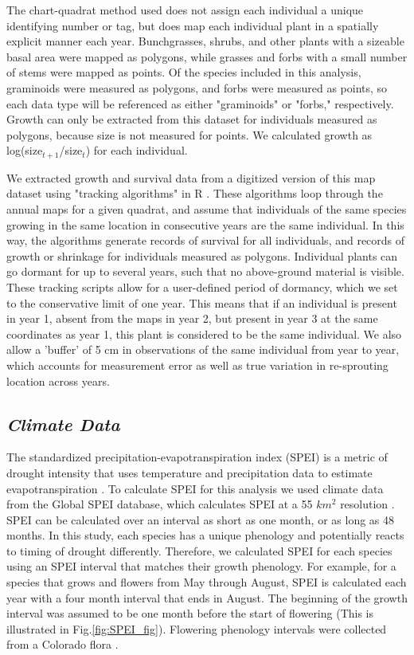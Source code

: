 \documentclass[12pt, letterpaper]{article}
\begin{document}
The chart-quadrat method used does not assign each individual a unique identifying number or tag, but does map each individual plant in a spatially explicit manner each year. Bunchgrasses, shrubs, and other plants with a sizeable basal area were mapped as polygons, while grasses and forbs with a small number of stems were mapped as points. Of the species included in this analysis, graminoids were measured as polygons, and forbs were measured as points, so each data type will be referenced as either "graminoids" or "forbs," respectively.  Growth can only be extracted from this dataset for individuals measured as polygons, because size is not measured for points. We calculated growth as log(size$_{t+1}$/size$_t$) for each individual.  

We extracted growth and survival data from a digitized version of this map dataset using "tracking algorithms" in R \citep{Lauenroth2008, RCoreTeam2019}. These algorithms loop through the annual maps for a given quadrat, and assume that individuals of the same species growing in the same location in consecutive years are the same individual. In this way, the algorithms generate records of survival for all individuals, and records of growth or shrinkage for individuals measured as polygons. Individual plants can go dormant for up to several years, such that no above-ground material is visible. These tracking scripts allow for a user-defined period of dormancy, which we set to the conservative limit of one year. This means that if an individual is present in year 1, absent from the maps in year 2, but present in year 3 at the same coordinates as year 1, this plant is considered to be the same individual. We also allow a 'buffer' of 5 cm in observations of the same individual from year to year, which accounts for measurement error as well as true variation in re-sprouting location across years. 
\subsection{\textit{Climate Data}} The standardized precipitation-evapotranspiration index (SPEI) is a metric of drought intensity that uses temperature and precipitation data to estimate evapotranspiration \citep{Vicente-Serrano2010}.  To calculate SPEI for this analysis we used climate data from the Global SPEI database, which calculates SPEI at a 55 $km^2$ resolution \citep{Vicente-Serrano2010}. SPEI can be calculated over an interval as short as one month, or as long as 48 months. In this study, each species has a unique phenology and potentially reacts to timing of drought differently. Therefore, we calculated SPEI for each species using an SPEI interval that matches their growth phenology. For example, for a species that grows and flowers from May through August, SPEI is calculated each year with a four month interval that ends in August. The beginning of the growth interval was assumed to be one month before the start of flowering (This is illustrated in Fig.\ref{fig:SPEI_fig}). Flowering phenology intervals were collected from a Colorado flora \citep{Ackerfield2015}.  
\end{document}
